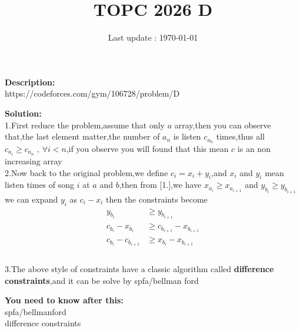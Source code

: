 \documentclass{article}
\begin{document}
\title{\textbf{TOPC 2026 D}}
\author{}
\date{Last update : \today}

\maketitle

\noindent \textbf{Description:}\\
https://codeforces.com/gym/106728/problem/D

\noindent \textbf{Solution:}\\
1.First reduce the problem,assume that only $a$ array,then you can observe that,the last element matter,the number of $a_n$ is listen $c_{a_n}$ times,thus all $c_{a_i}\ge c_{a_n}\text{ , }\forall i<n$,if you observe you will found that this mean $c$ is an non increasing array\\
2.Now back to the original problem,we define $c_i=x_i+y_i$,and $x_i$ and $y_i$ mean listen times of song $i$ at $a$ and $b$,then from [1.],we have $x_{a_i}\ge x_{a_{i+1}}$ and $y_{b_i}\ge y_{b_{i+1}}$ we can expand $y_i$ as $c_i-x_i$ then the constraints become 
\begin{align*}
	y_{b_i}&\ge y_{b_{i+1}}\\
	c_{b_i}-x_{b_i} &\ge c_{b_{i+1}}-x_{b_{i+1}}\\
	c_{b_i}-c_{b_{i+1}} &\ge x_{b_i}-x_{b_{i+1}}\\
\end{align*}
\\
3.The above style of constraints have a classic algorithm called \textbf{difference constraints},and it can be solve by spfa/bellman ford

\noindent \textbf{You need to know after this:}\\
spfa/bellmanford\\
difference constraints
\end{document}
